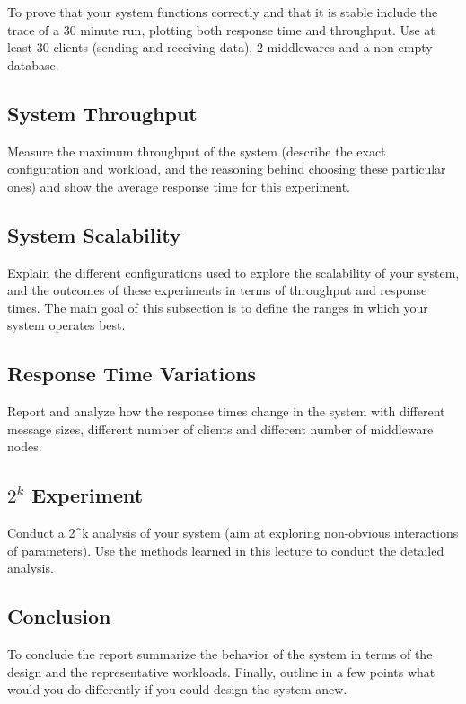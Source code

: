 \documentclass[11pt]{article}
\begin{document}
To prove that your system functions correctly and that it is stable
include the trace of a 30 minute run, plotting both response time and
throughput. Use at least 30 clients (sending and receiving data), 2
middlewares and a non-empty database.

\subsection{System Throughput}\label{sec:system-throughput}

Measure the maximum throughput of the system (describe the exact
configuration and workload, and the reasoning behind choosing these
particular ones) and show the average response time for this experiment.

\subsection{System Scalability}\label{sec:system-scalability}

Explain the different configurations used to explore the scalability of
your system, and the outcomes of these experiments in terms of
throughput and response times. The main goal of this subsection is to
define the ranges in which your system operates best.

\subsection{Response Time Variations}\label{sec:response-time-variations}

Report and analyze how the response times change in the system with
different message sizes, different number of clients and different
number of middleware nodes.

\subsection{$2^k$ Experiment}\label{sec:k-experiment}

Conduct a 2\^{}k analysis of your system (aim at exploring non-obvious
interactions of parameters). Use the methods learned in this lecture to
conduct the detailed analysis.

\subsection{Conclusion}\label{sec:conclusion}

To conclude the report summarize the behavior of the system in terms of
the design and the representative workloads. Finally, outline in a few
points what would you do differently if you could design the system
anew.
\end{document}
